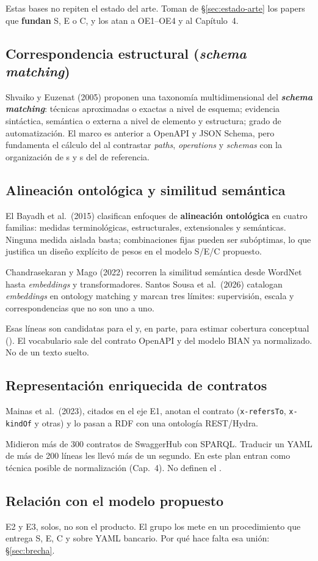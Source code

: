 Estas bases no repiten el estado del arte. Toman de §\ref{sec:estado-arte} los papers que
\textbf{fundan} S, E o C, y los atan a OE1--OE4 y al Capítulo~4.

\subsection{Correspondencia estructural (\textit{schema matching})}

Shvaiko y Euzenat (2005) proponen una taxonomía multidimensional del \textbf{\textit{schema
matching}}: técnicas aproximadas o exactas a nivel de esquema; evidencia sintáctica, semántica o
externa a nivel de elemento y estructura; grado de automatización. El marco es anterior a OpenAPI y
JSON Schema, pero fundamenta el cálculo del \StructuralScore{} al contrastar \textit{paths},
\textit{operations} y \textit{schemas} con la organización de \Behavior{}s y \BusinessObject{}s del
\ServiceDomain{} de referencia.

\subsection{Alineación ontológica y similitud semántica}

El Bayadh et al.\ (2015) clasifican enfoques de \textbf{alineación ontológica} en cuatro familias:
medidas terminológicas, estructurales, extensionales y semánticas. Ninguna medida aislada basta;
combinaciones fijas pueden ser subóptimas, lo que justifica un diseño explícito de pesos en el
modelo S/E/C propuesto.

Chandrasekaran y Mago (2022) recorren la similitud semántica desde WordNet hasta \textit{embeddings}
y transformadores. Santos Sousa et al.\ (2026) catalogan \textit{embeddings} en ontology matching y
marcan tres límites: supervisión, escala y correspondencias que no son uno a uno.

Esas líneas son candidatas para el \SemanticScore{} y, en parte, para estimar cobertura conceptual
(\CoverageScore{}). El vocabulario sale del contrato OpenAPI y del modelo BIAN ya normalizado. No
de un texto suelto.

\subsection{Representación enriquecida de contratos}

Mainas et al.\ (2023), citados en el eje E1, anotan el contrato (\texttt{x-refersTo},
\texttt{x-kindOf} y otras) y lo pasan a RDF con una ontología REST/Hydra.

Midieron más de 300 contratos de SwaggerHub con SPARQL. Traducir un YAML de más de 200 líneas les
llevó más de un segundo. En este plan entran como técnica posible de normalización (Cap.~4). No
definen el \SemanticScore{}.

\subsection{Relación con el modelo propuesto}

E2 y E3, solos, no son el producto. El grupo los mete en un procedimiento que entrega S, E, C y
\AlignmentScore{} sobre YAML bancario. Por qué hace falta esa unión: §\ref{sec:brecha}.
